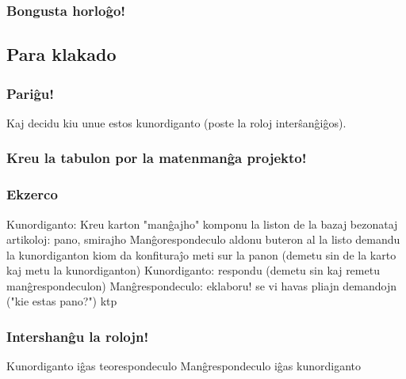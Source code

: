 \documentclass{beamer}
\begin{document}
  \begin{frame}
    \frametitle{Bongusta horloĝo!}
  \end{frame}

\subsection{Para klakado}
  \begin{frame}
    \frametitle{Pariĝu!}
    Kaj decidu kiu unue estos kunordiganto (poste la roloj interŝanĝiĝos).
  \end{frame}

  \begin{frame}
    \frametitle{Kreu la tabulon por la matenmanĝa projekto!}
  \end{frame}

  \begin{frame}
    \frametitle{Ekzerco}
    Kunordiganto:
        Kreu karton "manĝajho"
        komponu la liston de la bazaj bezonataj artikoloj: pano, smirajho
    Manĝorespondeculo
        aldonu buteron al la listo
        demandu la kunordiganton kiom da konfituraĵo meti sur la panon (demetu sin de la karto kaj metu la kunordiganton)
    Kunordiganto:
        respondu (demetu sin kaj remetu manĝrespondeculon)
    Manĝrespondeculo:
        eklaboru! se vi havas pliajn demandojn ("kie estas pano?") ktp
  \end{frame}


  \begin{frame}
    \frametitle{Intershanĝu la rolojn!}
    Kunordiganto iĝas teorespondeculo
    Manĝrespondeculo iĝas kunordiganto
  \end{frame}
\end{document}
